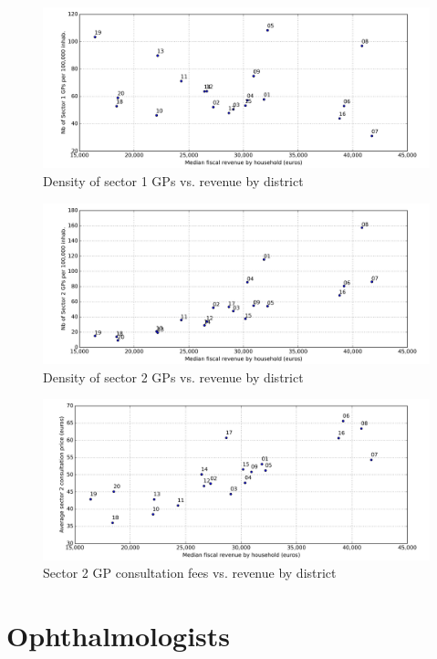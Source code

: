 \documentclass[11pt]{article}
\begin{document}
\begin{figure}[H]
    \caption{Density of sector 1 GPs vs. revenue by district}
	\centering
		\includegraphics[width=16cm]{images/GP_Ardt_DensityS1VsRevenue.png}
\end{figure}

\begin{figure}[H]
    \caption{Density of sector 2 GPs vs. revenue by district}
	\centering
		\includegraphics[width=16cm]{images/GP_Ardt_DensityS2VsRevenue.png}
\end{figure}

\begin{figure}[H]
    \caption{Sector 2 GP consultation fees vs. revenue by district}
	\centering
		\includegraphics[width=16cm]{images/GP_Ardt_ConsultationS2VsRevenue.png}
\end{figure}

\section{Ophthalmologists}
\end{document}
